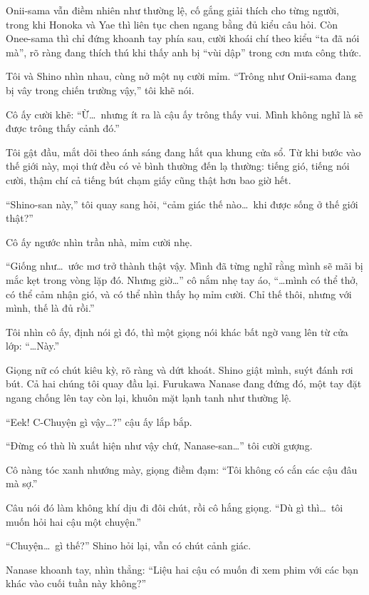\documentclass[../main.tex]{subfiles}
\begin{document}
Onii-sama vẫn điềm nhiên như thường lệ, cố gắng giải thích cho từng người, trong khi Honoka và Yae thì liên tục chen ngang bằng đủ kiểu câu hỏi. Còn Onee-sama thì chỉ đứng khoanh tay phía sau, cười khoái chí theo kiểu ``ta đã nói mà'', rõ ràng đang thích thú khi thấy anh bị ``vùi dập'' trong cơn mưa công thức.

Tôi và Shino nhìn nhau, cùng nở một nụ cười mỉm. ``Trông như Onii-sama đang bị vây trong chiến trường vậy,'' tôi khẽ nói.

Cô ấy cười khẽ: ``Ừ\dots\ nhưng ít ra là cậu ấy trông thấy vui. Mình không nghĩ là sẽ được trông thấy cảnh đó.''

Tôi gật đầu, mắt dõi theo ánh sáng đang hắt qua khung cửa sổ. Từ khi bước vào thế giới này, mọi thứ đều có vẻ bình thường đến lạ thường: tiếng gió, tiếng nói cười, thậm chí cả tiếng bút chạm giấy cũng thật hơn bao giờ hết.

``Shino-san này,'' tôi quay sang hỏi, ``cảm giác thế nào\dots\ khi được sống ở thế giới thật?''

Cô ấy ngước nhìn trần nhà, mỉm cười nhẹ.

``Giống như\dots\ ước mơ trở thành thật vậy. Mình đã từng nghĩ rằng mình sẽ mãi bị mắc kẹt trong vòng lặp đó. Nhưng giờ\dots'' cô nắm nhẹ tay áo, ``\dots mình có thể thở, có thể cảm nhận gió, và có thể nhìn thấy họ mỉm cười. Chỉ thế thôi, nhưng với mình, thế là đủ rồi.''

Tôi nhìn cô ấy, định nói gì đó, thì một giọng nói khác bất ngờ vang lên từ cửa lớp: ``\dots Này.''

Giọng nữ có chút kiêu kỳ, rõ ràng và dứt khoát. Shino giật mình, suýt đánh rơi bút. Cả hai chúng tôi quay đầu lại. Furukawa Nanase đang đứng đó, một tay đặt ngang chống lên tay còn lại, khuôn mặt lạnh tanh như thường lệ.


``Eek! C-Chuyện gì vậy\dots?'' cậu ấy lắp bắp.

``Đừng có thù lù xuất hiện như vậy chứ, Nanase-san\dots'' tôi cười gượng.

Cô nàng tóc xanh nhướng mày, giọng điềm đạm: ``Tôi không có cắn các cậu đâu mà sợ.''

Câu nói đó làm không khí dịu đi đôi chút, rồi cô hắng giọng. ``Dù gì thì\dots\ tôi muốn hỏi hai cậu một chuyện.''

``Chuyện\dots\ gì thế?'' Shino hỏi lại, vẫn có chút cảnh giác.

Nanase khoanh tay, nhìn thẳng: ``Liệu hai cậu có muốn đi xem phim với các bạn khác vào cuối tuần này không?''
\end{document}
